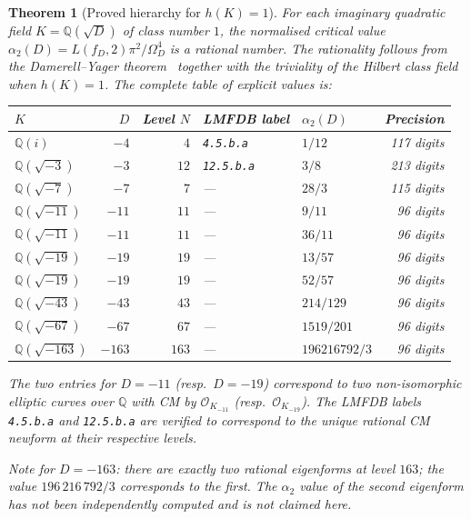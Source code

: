 \documentclass[12pt]{amsart}
\newtheorem{theorem}{Theorem}[section]
\theoremstyle{definition}
\newcommand{\Q}{\mathbb{Q}}
\newcommand{\OK}{\mathcal{O}_K}
\newcommand{\Omega}{\varOmega}
\begin{document}
\begin{theorem}[Proved hierarchy for $h(K)=1$]
  \label{thm:hierarchy}
  For each imaginary quadratic field $K = \Q(\sqrt{D})$ of class number $1$,
  the normalised critical value $\alpha_2(D) = L(f_D,2)\pi^2/\Omega_D^4$
  is a rational number. The rationality follows from the Damerell--Yager
  theorem~\cite{Damerell1971,Yager1982} together with the triviality of
  the Hilbert class field when $h(K)=1$. The complete table of explicit
  values is:

  \begin{center}
  \renewcommand{\arraystretch}{1.35}
  \begin{tabular}{lrrllr}
    \toprule
    $K$ & $D$ & Level $N$ & LMFDB label & $\alpha_2(D)$ & Precision \\
    \midrule
    $\Q(i)$         & $-4$   & $4$   & \texttt{4.5.b.a}  & $1/12$          & 117 digits \\
    $\Q(\sqrt{-3})$ & $-3$   & $12$  & \texttt{12.5.b.a} & $3/8$           & 213 digits \\
    $\Q(\sqrt{-7})$ & $-7$   & $7$   & ---               & $28/3$          & 115 digits \\
    $\Q(\sqrt{-11})$& $-11$  & $11$  & ---               & $9/11$          &  96 digits \\
    $\Q(\sqrt{-11})$& $-11$  & $11$  & ---               & $36/11$         &  96 digits \\
    $\Q(\sqrt{-19})$& $-19$  & $19$  & ---               & $13/57$         &  96 digits \\
    $\Q(\sqrt{-19})$& $-19$  & $19$  & ---               & $52/57$         &  96 digits \\
    $\Q(\sqrt{-43})$& $-43$  & $43$  & ---               & $214/129$       &  96 digits \\
    $\Q(\sqrt{-67})$& $-67$  & $67$  & ---               & $1519/201$      &  96 digits \\
    $\Q(\sqrt{-163})$& $-163$ & $163$ & ---              & $196216792/3$   &  96 digits \\
    \bottomrule
  \end{tabular}
  \end{center}

  The two entries for $D = -11$ (resp.\ $D = -19$) correspond to two
  non-isomorphic elliptic curves over $\Q$ with CM by $\OK_{-11}$
  (resp.\ $\OK_{-19}$).
  The LMFDB labels \texttt{4.5.b.a} and \texttt{12.5.b.a} are verified to
  correspond to the unique rational CM newform at their respective levels.

  \emph{Note for $D = -163$:} there are exactly two rational eigenforms at
  level $163$; the value $196\,216\,792/3$ corresponds to the first. The
  $\alpha_2$ value of the second eigenform has not been independently
  computed and is not claimed here.
\end{theorem}
\end{document}
